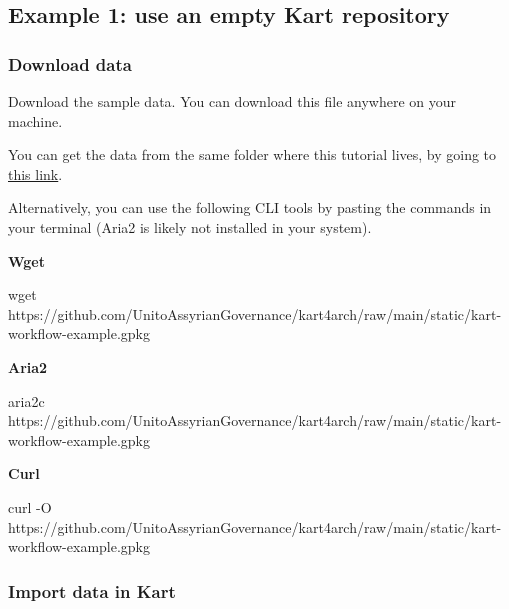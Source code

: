 \documentclass[
  letterpaper,
  DIV=11,
  numbers=noendperiod]{scrartcl}
\newenvironment{Shaded}{\begin{snugshade}}{\end{snugshade}}
\newcommand{\AttributeTok}[1]{\textcolor[rgb]{1.00,0.47,0.78}{#1}}
\newcommand{\ExtensionTok}[1]{\textcolor[rgb]{0.55,0.91,0.99}{#1}}
\newcommand{\FunctionTok}[1]{\textcolor[rgb]{0.31,0.98,0.48}{#1}}
\newcommand{\NormalTok}[1]{\textcolor[rgb]{0.97,0.97,0.95}{#1}}
\begin{document}
\subsection{Example 1: use an empty Kart
repository}\label{sec-kart-empty}

\subsubsection{Download data}\label{download-data}

Download the sample data. You can download this file anywhere on your
machine.

You can get the data from the same folder where this tutorial lives, by
going to
\href{https://github.com/UnitoAssyrianGovernance/kart4arch/raw/main/static/kart-workflow-example.gpkg}{this
link}.

Alternatively, you can use the following CLI tools by pasting the
commands in your terminal (Aria2 is likely not installed in your
system).

\textbf{Wget}

\begin{Shaded}
\begin{Highlighting}[]
\FunctionTok{wget}\NormalTok{ https://github.com/UnitoAssyrianGovernance/kart4arch/raw/main/static/kart{-}workflow{-}example.gpkg}
\end{Highlighting}
\end{Shaded}

\textbf{Aria2}

\begin{Shaded}
\begin{Highlighting}[]
\ExtensionTok{aria2c}\NormalTok{ https://github.com/UnitoAssyrianGovernance/kart4arch/raw/main/static/kart{-}workflow{-}example.gpkg}
\end{Highlighting}
\end{Shaded}

\textbf{Curl}

\begin{Shaded}
\begin{Highlighting}[]
\ExtensionTok{curl} \AttributeTok{{-}O}\NormalTok{ https://github.com/UnitoAssyrianGovernance/kart4arch/raw/main/static/kart{-}workflow{-}example.gpkg}
\end{Highlighting}
\end{Shaded}

\subsubsection{Import data in Kart}\label{sec-kart-import}
\end{document}
